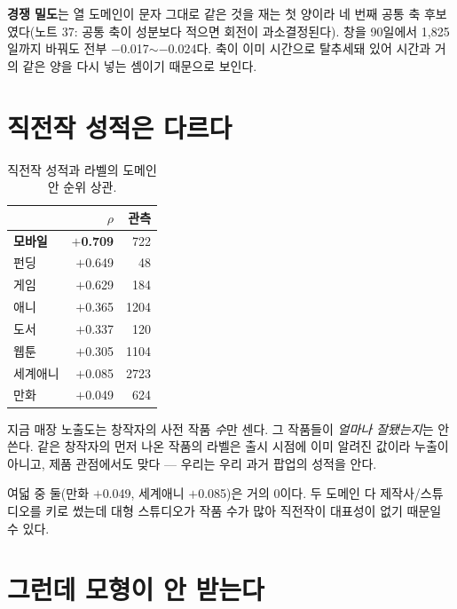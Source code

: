 \documentclass[10pt]{article}
\begin{document}
\textbf{경쟁 밀도}는 열 도메인이 문자 그대로 같은 것을 재는 첫 양이라 네 번째
공통 축 후보였다(노트 37: 공통 축이 성분보다 적으면 회전이 과소결정된다).
창을 90일에서 1,825일까지 바꿔도 전부 $-$0.017$\sim-$0.024다. 축이 이미 시간으로
탈추세돼 있어 시간과 거의 같은 양을 다시 넣는 셈이기 때문으로 보인다.

\section{직전작 성적은 다르다}

\begin{table}[t]
\centering\tsize
\caption{직전작 성적과 라벨의 도메인 안 순위 상관.}
\begin{tabular}{lrr}
\toprule
& $\rho$ & 관측 \\
\midrule
\textbf{모바일} & \textbf{$+$0.709} & 722 \\
펀딩 & $+$0.649 & 48 \\
게임 & $+$0.629 & 184 \\
애니 & $+$0.365 & 1204 \\
도서 & $+$0.337 & 120 \\
웹툰 & $+$0.305 & 1104 \\
세계애니 & $+$0.085 & 2723 \\
만화 & $+$0.049 & 624 \\
\bottomrule
\end{tabular}
\end{table}

지금 매장 노출도는 창작자의 사전 작품 \emph{수}만 센다. 그 작품들이 \emph{얼마나
잘됐는지}는 안 쓴다. 같은 창작자의 먼저 나온 작품의 라벨은 출시 시점에 이미
알려진 값이라 누출이 아니고, 제품 관점에서도 맞다 --- 우리는 우리 과거 팝업의
성적을 안다.

{여덟 중 둘(만화 $+$0.049, 세계애니 $+$0.085)은 거의 0이다. 두 도메인 다
제작사/스튜디오를 키로 썼는데 대형 스튜디오가 작품 수가 많아 직전작이 대표성이
없기 때문일 수 있다.}

\section{그런데 모형이 안 받는다}
\end{document}

